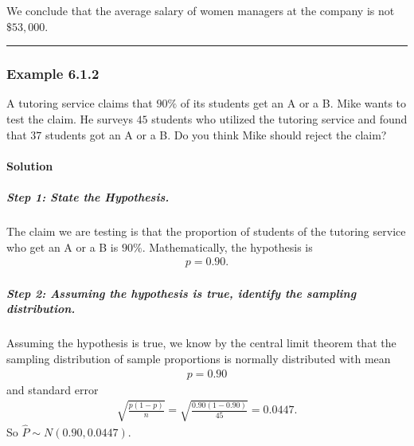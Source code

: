 \documentclass[letterpaper,10pt,english]{jupyterBook}
\begin{document}
\sphinxAtStartPar
We conclude that the average salary of women managers at the company is not \(\$53,000\).


\bigskip\hrule\bigskip



\subsubsection{Example 6.1.2}
\label{\detokenize{Ch6 An Introduction to Hypothesis Testing/6.1 An Introduction to Hypothesis Testing:example-6-1-2}}
\sphinxAtStartPar
A tutoring service claims that \(90\%\) of its students get an A or a B. Mike wants to test the claim. He surveys \(45\) students who utilized the tutoring service and found that \(37\) students got an A or a B. Do you think Mike should reject the claim?


\paragraph{Solution}
\label{\detokenize{Ch6 An Introduction to Hypothesis Testing/6.1 An Introduction to Hypothesis Testing:id1}}

\subparagraph{Step 1: State the Hypothesis.}
\label{\detokenize{Ch6 An Introduction to Hypothesis Testing/6.1 An Introduction to Hypothesis Testing:id2}}
\sphinxAtStartPar
The claim we are testing is that the proportion of students of the tutoring service who get an A or a B is \(90\%\). Mathematically, the hypothesis is
\begin{equation*}
\begin{split}p = 0.90. \end{split}
\end{equation*}

\subparagraph{Step 2: Assuming the hypothesis is true, identify the sampling distribution.}
\label{\detokenize{Ch6 An Introduction to Hypothesis Testing/6.1 An Introduction to Hypothesis Testing:id3}}
\sphinxAtStartPar
Assuming the hypothesis is true, we know by the central limit theorem that the sampling distribution of sample proportions is normally distributed with mean
\begin{equation*}
\begin{split} p = 0.90 \end{split}
\end{equation*}
\sphinxAtStartPar
and standard error
\begin{equation*}
\begin{split} \sqrt{\frac{p(1 - p)}{n}} = \sqrt{\frac{0.90(1 - 0.90)}{45}} = 0.0447. \end{split}
\end{equation*}
\sphinxAtStartPar
So \(\hat{P} \sim N(0.90, 0.0447)\).
\end{document}
